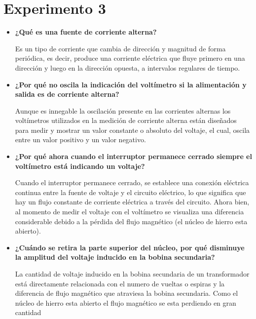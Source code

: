 \documentclass[letterpaper, 12pt]{report}
\begin{document}
\section*{Experimento 3}

\begin{itemize}[label=$\bullet$]
      \item \textbf{¿Qué es una fuente de corriente alterna?}

            Es un tipo de corriente que cambia de dirección y magnitud
            de forma periódica, es decir, produce una corriente
            eléctrica que fluye primero en una dirección y luego en la
            dirección opuesta, a intervalos regulares de tiempo.

      \item \textbf{¿Por qué no oscila la indicación del voltímetro si la alimentación y salida es de
                  corriente alterna?}

            Aunque es innegable la oscilación presente en las
            corrientes alternas los voltímetros utilizados en la
            medición de corriente alterna están diseñados para medir y
            mostrar un valor constante o absoluto del voltaje, el cual,
            oscila entre un valor positivo y un valor negativo.

      \item \textbf{¿Por qué ahora cuando el interruptor permanece cerrado siempre el voltímetro está
                  indicando un voltaje?}

            Cuando el interruptor permanece cerrado, se establece una
            conexión eléctrica continua entre la fuente de voltaje y el
            circuito eléctrico, lo que significa que hay un flujo
            constante de corriente eléctrica a través del circuito.
            Ahora bien, al momento de medir el voltaje con el
            voltímetro se visualiza una diferencia considerable debido
            a la pérdida del flujo magnético (el núcleo de hierro esta
            abierto).

      \item \textbf{¿Cuándo se retira la parte superior del núcleo, por qué disminuye la amplitud del
                  voltaje inducido en la bobina secundaria?}

            La cantidad de voltaje inducido en la bobina secundaria de
            un transformador está directamente relacionada con el
            numero de vueltas o espiras y la diferencia de flujo
            magnético que atraviesa la bobina secundaria. Como el
            núcleo de hierro esta abierto el flujo magnético se esta
            perdiendo en gran cantidad


\end{itemize}
\end{document}
